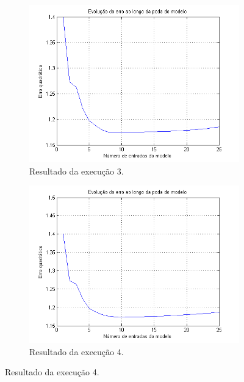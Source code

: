 \begin{figure}[H]
			\begin{subfigure}{.5\textwidth}
				  \centering
				  \includegraphics[width=1\linewidth]{image/backward3}
				  \caption{Resultado da execução 3.}
				  \label{backward3}
				\end{subfigure}%
				\begin{subfigure}{.5\textwidth}
				  \centering
				  \includegraphics[width=1\linewidth]{image/backward4}
				  \caption{Resultado da execução 4.}
				  \label{backward4}
				\end{subfigure}			
			

\end{figure}
